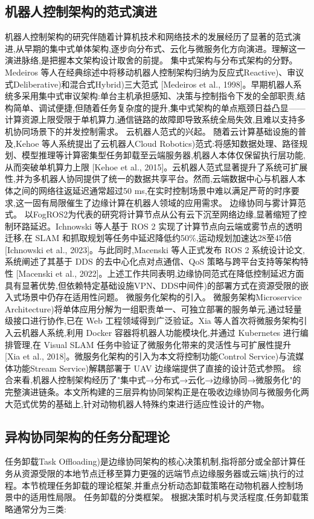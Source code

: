\subsection{机器人控制架构的范式演进}
机器人控制架构的研究伴随着计算机技术和网络技术的发展经历了显著的范式演进,从早期的集中式单体架构,逐步向分布式、云化与微服务化方向演进。理解这一演进脉络,是把握本文架构设计取舍的前提。
集中式架构与分布式架构的分野。 Medeiros 等人在经典综述中将移动机器人控制架构归纳为反应式Reactive)、审议式Deliberative)和混合式Hybrid)三大范式 [Medeiros et al., 1998]。早期机器人系统多采用集中式审议架构:单台主机承担感知、决策与控制指令下发的全部职责,结构简单、调试便捷,但随着任务复杂度的提升,集中式架构的单点瓶颈日益凸显——计算资源上限受限于单机算力,通信链路的故障即导致系统全局失效,且难以支持多机协同场景下的并发控制需求。
云机器人范式的兴起。 随着云计算基础设施的普及,Kehoe 等人系统提出了云机器人Cloud Robotics)范式:将感知数据处理、路径规划、模型推理等计算密集型任务卸载至云端服务器,机器人本体仅保留执行层功能,从而突破单机算力上限 [Kehoe et al., 2015]。云机器人范式显著提升了系统可扩展性,并为多机器人协同提供了统一的数据共享平台。然而,云端数据中心与机器人本体之间的网络往返延迟通常超过50 ms,在实时控制场景中难以满足严苛的时序要求,这一固有局限催生了边缘计算在机器人领域的应用需求。
边缘协同与雾计算范式。 以FogROS2为代表的研究将计算节点从公有云下沉至网络边缘,显著缩短了控制环路延迟。Ichnowski 等人基于 ROS 2 实现了计算节点向云端或雾节点的透明迁移,在 SLAM 和抓取规划等任务中延迟降低约50\%,运动规划加速达28至45倍 [Ichnowski et al., 2023]。与此同时,Macenski 等人正式发布 ROS 2 系统设计论文,系统阐述了其基于 DDS 的去中心化点对点通信、QoS 策略与跨平台支持等架构特性 [Macenski et al., 2022]。上述工作共同表明,边缘协同范式在降低控制延迟方面具有显著优势,但依赖特定基础设施VPN、DDS中间件)的部署方式在资源受限的嵌入式场景中仍存在适用性问题。
微服务化架构的引入。 微服务架构Microservice Architecture)将单体应用分解为一组职责单一、可独立部署的服务单元,通过轻量级接口进行协作,已在 Web 工程领域得到广泛验证。Xia 等人首次将微服务架构引入云机器人系统,利用 Docker 容器将机器人功能模块化,并通过 Kubernetes 进行编排管理,在 Visual SLAM 任务中验证了微服务化带来的灵活性与可扩展性提升 [Xia et al., 2018]。微服务化架构的引入为本文将控制功能Control Service)与流媒体功能Stream Service)解耦部署于 UAV 边缘端提供了直接的设计范式参照。
综合来看,机器人控制架构经历了"集中式→分布式→云化→边缘协同→微服务化"的完整演进链条。本文所构建的三层异构协同架构正是在吸收边缘协同与微服务化两大范式优势的基础上,针对动物机器人特殊约束进行适应性设计的产物。

\subsection{异构协同架构的任务分配理论}
任务卸载Task Offloading)是边缘协同架构的核心决策机制,指将部分或全部计算任务从资源受限的本地节点迁移至算力更强的远端节点边缘服务器或云端)执行的过程。本节梳理任务卸载的理论框架,并重点分析动态卸载策略在动物机器人控制场景中的适用性局限。
任务卸载的分类框架。 根据决策时机与灵活程度,任务卸载策略通常分为三类:

